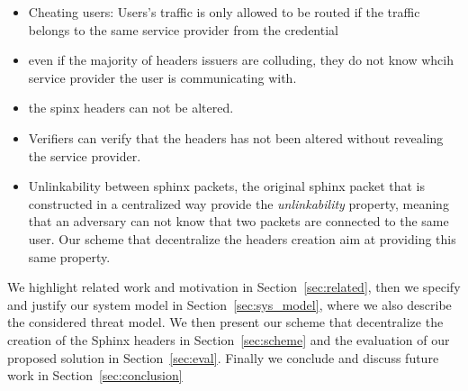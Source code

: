\begin{itemize}
	\item Cheating users: Users's traffic is only allowed to be routed if the traffic belongs to the same service provider from the credential
	\item even if the majority of headers issuers are colluding, they do not know whcih service provider the user is communicating with.
	\item the spinx headers can not be altered.
	\item Verifiers can verify that the headers has not been altered without revealing the service provider.
	\item Unlinkability between  sphinx packets, the original sphinx packet that is constructed in a centralized way provide the \textit{unlinkability} property, meaning that an adversary can not know that two packets are connected to the same user. Our scheme that decentralize the headers creation aim at providing this same property.
\end{itemize}
We highlight related work and motivation in Section~\ref{sec:related}, then we specify and justify our system model in Section~\ref{sec:sys_model}, where we also describe the considered threat model. We then present our scheme that decentralize the creation of the Sphinx headers in Section~\ref{sec:scheme} and the evaluation of our proposed solution in Section~\ref{sec:eval}. Finally we conclude and discuss future work in Section~\ref{sec:conclusion}